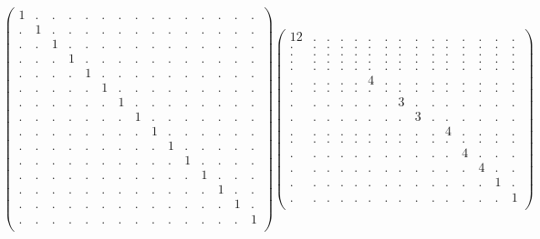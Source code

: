 \documentclass[12pt,a4paper]{amsart}
\begin{document}
\begin{align*}
\left(\begin{array}{rrrrrrrrrrrrrrr}%
1&.&.&.&.&.&.&.&.&.&.&.&.&.&.\\%
.&1&.&.&.&.&.&.&.&.&.&.&.&.&.\\%
.&.&1&.&.&.&.&.&.&.&.&.&.&.&.\\%
.&.&.&1&.&.&.&.&.&.&.&.&.&.&.\\%
.&.&.&.&1&.&.&.&.&.&.&.&.&.&.\\%
.&.&.&.&.&1&.&.&.&.&.&.&.&.&.\\%
.&.&.&.&.&.&1&.&.&.&.&.&.&.&.\\%
.&.&.&.&.&.&.&1&.&.&.&.&.&.&.\\%
.&.&.&.&.&.&.&.&1&.&.&.&.&.&.\\%
.&.&.&.&.&.&.&.&.&1&.&.&.&.&.\\%
.&.&.&.&.&.&.&.&.&.&1&.&.&.&.\\%
.&.&.&.&.&.&.&.&.&.&.&1&.&.&.\\%
.&.&.&.&.&.&.&.&.&.&.&.&1&.&.\\%
.&.&.&.&.&.&.&.&.&.&.&.&.&1&.\\%
.&.&.&.&.&.&.&.&.&.&.&.&.&.&1\\%
\end{array}\right)%
\left(\begin{array}{rrrrrrrrrrrrrrr}%
12&.&.&.&.&.&.&.&.&.&.&.&.&.&.\\%
.&.&.&.&.&.&.&.&.&.&.&.&.&.&.\\%
.&.&.&.&.&.&.&.&.&.&.&.&.&.&.\\%
.&.&.&.&.&.&.&.&.&.&.&.&.&.&.\\%
.&.&.&.&.&.&.&.&.&.&.&.&.&.&.\\%
.&.&.&.&.&4&.&.&.&.&.&.&.&.&.\\%
.&.&.&.&.&.&.&.&.&.&.&.&.&.&.\\%
.&.&.&.&.&.&.&3&.&.&.&.&.&.&.\\%
.&.&.&.&.&.&.&.&3&.&.&.&.&.&.\\%
.&.&.&.&.&.&.&.&.&.&4&.&.&.&.\\%
.&.&.&.&.&.&.&.&.&.&.&.&.&.&.\\%
.&.&.&.&.&.&.&.&.&.&.&4&.&.&.\\%
.&.&.&.&.&.&.&.&.&.&.&.&4&.&.\\%
.&.&.&.&.&.&.&.&.&.&.&.&.&1&.\\%
.&.&.&.&.&.&.&.&.&.&.&.&.&.&1\\%
\end{array}\right)%
\end{align*}
\end{document}
